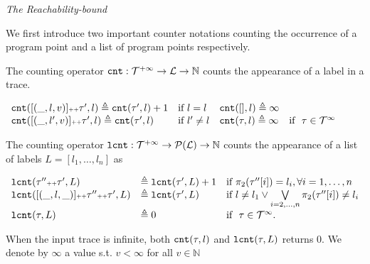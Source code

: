 
\emph{The Reachability-bound}


We first introduce two important counter notations counting the occurrence of a program point and a list of program points respectively.
\begin{defn}
 \label{def:counter}
The counting operator $\mathtt{cnt} : \mathcal{T}^{+\infty} \to \mathcal{L} \to \mathbb{N}$
counts the appearance of a label in a trace.
\begin{center}
{\small
$
\begin{array}{llll}
\mathtt{cnt}([(\_, l, v)] {\scriptscriptstyle ++} \mathtt{\tau}', l ) \triangleq \mathtt{cnt}(\mathtt{\tau}', l) + 1 & \text{if}~ l = l
&
\mathtt{cnt}({[]}, l) \triangleq \infty & 
\\
\mathtt{cnt}([(\_, l', v)] {\scriptscriptstyle ++} \mathtt{\tau}', l) \triangleq \mathtt{cnt}(\mathtt{\tau}', l) & \text{if}~ l' \neq l
&
\mathtt{cnt}(\mathtt{\tau}, l) \triangleq \infty & \text{if }~ \mathtt{\tau} \in \mathcal{T}^{\infty}
\end{array}
$
}
\end{center}
\end{defn}
\begin{defn}
 \label{def:lcounter}
 The counting operator $\mathtt{lcnt} : \mathcal{T}^{+\infty} \to \mathcal{P}(\mathcal{L}) \to \mathbb{N}$
 counts the appearance of a list of labels $L = [l_1, \ldots, l_n]$ as
{\small
\begin{center}
 $
 \begin{array}{lll}
 \mathtt{lcnt}(\mathtt{\tau}'' {\scriptscriptstyle ++} \mathtt{\tau}', L ) 
 & \triangleq \mathtt{lcnt}(\mathtt{\tau}', L) + 1 & \text{if}~ \pi_2(\mathtt{\tau}''[i]) = l_i, \forall i = 1, \ldots, n
 \\ 
 \mathtt{lcnt}([(\_, l, \_)] {\scriptscriptstyle ++} \mathtt{\tau}'' {\scriptscriptstyle ++} \mathtt{\tau}', L ) 
 & \triangleq \mathtt{lcnt}(\mathtt{\tau}', L) & \text{if}~ l \neq l_1 \lor \bigvee\limits_{i = 2, \ldots, n} \pi_2(\mathtt{\tau}''[i]) \neq l_i
 \\ 
 \mathtt{lcnt}(\mathtt{\tau}, L ) 
 & \triangleq 0 & \text{if }~ \mathtt{\tau} \in \mathcal{T}^{\infty}.
 \end{array}
 $
 \end{center}
 }
\end{defn}
%
When the input trace is infinite, both $\mathtt{cnt}(\mathtt{\tau}, l)$ and $\mathtt{lcnt}(\mathtt{\tau}, L)$ returns $0$.
We denote by $\infty$ a value s.t. $v < \infty $ for all $v \in \mathbb{N}$


